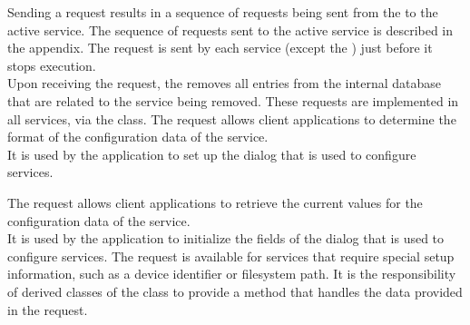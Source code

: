 Sending a  request results in a sequence of
requests being sent from the  to the active service.
The sequence of requests sent to the active service is described in the 
 appendix.
The  request is sent by each service
(except the ) just before it stops execution.\\

Upon receiving the  request, the
 removes all entries from the internal database that
are related to the service being removed.
\secondaryEnd
{}
These requests are implemented in all \mplusm{}  services, via the
 class.
The  request allows client
applications to determine the format of the configuration data of the service.\\

It is used by the \emph{\MMMU} application to set up the dialog that is used to configure
services.

The  request allows client
applications to retrieve the current values for the configuration data of the service.\\

It is used by the \emph{\MMMU} application to initialize the fields of the dialog that is
used to configure services.
The  request is available for
 services that require special setup information, such as a device
identifier or file\longDash{}system path.
It is the responsibility of derived classes of the
 class to provide a method that handles the
data provided in the  request.\\

